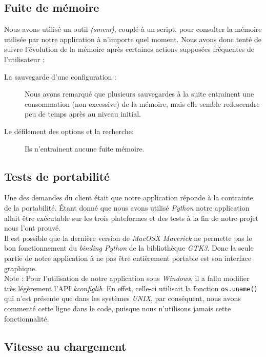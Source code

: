 \documentclass[17pts]{report}
\begin{document}
\subsection{Fuite de mémoire}
\label{sub:Fuite de mémoire}
Nous avons utilisé un outil \textit{(smem)}, couplé à un script, pour consulter
la mémoire utilisée par notre application à n'importe quel moment. Nous avons
donc tenté de suivre l'évolution de la mémoire après certaines actions
supposées fréquentes de l'utilisateur :

\begin{description}
    \item[La sauvegarde d'une configuration :] Nous avons remarqué que
        plusieurs sauvegardes à la suite entrainent une consommation (non
        excessive) de la mémoire, mais elle semble redescendre peu de temps
        après au niveau initial.
    \item[Le défilement des options et la recherche:] Ils n'entrainent aucune
        fuite mémoire.
\end{description}

\subsection{Tests de portabilité}
\label{sub:Tests de portabilité}

Une des demandes du client était que notre application réponde à la contrainte
de la portabilité. Étant donné que nous avons utilisé \textit{Python} notre
application allait être exécutable sur les trois plateformes et des tests à la
fin de notre projet nous l'ont prouvé.\\
Il est possible que la dernière version de \textit{MacOSX Maverick} ne permette
pas le bon fonctionnement du \textit{binding Python} de la bibliothèque
\textit{GTK3}. Donc la seule partie de notre application à ne pas être
entièrement portable est son interface graphique.\\

Note : Pour l'utilisation de notre application sous \textit{Windows}, il a fallu
modifier très légèrement l'API \textit{kconfiglib}. En effet, celle-ci
utilisait la fonction \verb|os.uname()| qui n'est présente que dans les
systèmes \textit{UNIX}, par conséquent, nous avons commenté cette ligne dans le
code, puisque nous n'utilisons jamais cette fonctionnalité.

\subsection{Vitesse au chargement}
\label{sub:Vitesse au chargement}
\end{document}
